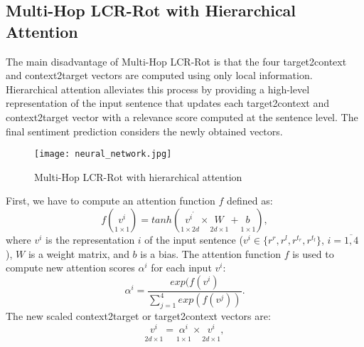 \documentclass[hidelinks]{llncs}
\begin{document}
\subsection{Multi-Hop LCR-Rot with Hierarchical Attention}\label{Hierarchical}

The main disadvantage of Multi-Hop LCR-Rot is that the four target2context and context2target vectors are computed using only local information. Hierarchical attention alleviates this process by providing a high-level representation of the input sentence that updates each target2context and context2target vector with a relevance score computed at the sentence level. The final sentiment prediction considers the newly obtained vectors.

\begin{figure}[!b]
\vspace{-0.5cm}
\centering
\texttt{[image: neural\_network.jpg]}
\caption{Multi-Hop LCR-Rot with hierarchical attention} 	
\label{fig:figure_1}
\end{figure} 

First, we have to compute an attention function $f$ defined as:
\begin {equation}
\label{equation11}
f(\underset{1 \times 1}{v^i_{}}) = tanh(\underset{1 \times 2d}{v^{i^'}_{}} \times \underset{2d \times 1}{W_{ }^{ }} + \underset{1 \times 1}{b_{ }^{ }}),
\end {equation}
where $v^i$ is the representation $i$ of the input sentence ($v^i \in \{r^r, r^l, r^{t_r},r^{t_l}\}$, $i = \overline{1,4}$), $W$ is a weight matrix, and $b$ is a bias. The attention function $f$ is used to compute new attention scores $\alpha^i$ for each input $v^i$:
\begin {equation}
\label{equation12}
\alpha^i = \frac{exp(f(v^i)}{\sum_{j=1}^4 exp(f(v^j))}.
\end {equation}
The new scaled context2target or target2context vectors are:
\begin {equation}
\label{equation13}
\underset{2d \times 1}{v^i_{ }} = \underset{1 \times 1}{\alpha^i_{ }} \times \underset{2d \times 1}{v^i_{ }},
\end {equation}
\end{document}

